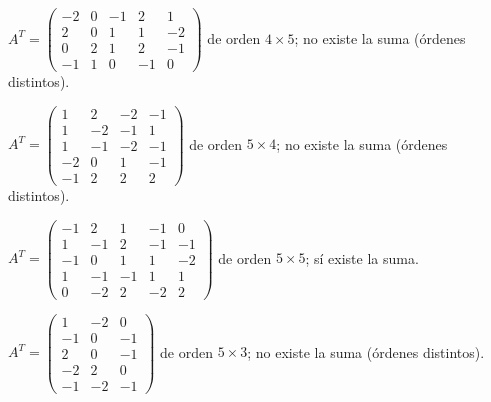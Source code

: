 \documentclass[12pt]{article}
\theoremstyle{remark}
\begin{document}
\begin{description}[style=nextline,leftmargin=3em,itemsep=0.45em]
\item[E93.] $A^T=\begin{pmatrix}-2&0&-1&2&1\\2&0&1&1&-2\\0&2&1&2&-1\\-1&1&0&-1&0\end{pmatrix}$ de orden $4\times 5$; no existe la suma (órdenes distintos).
\item[E94.] $A^T=\begin{pmatrix}1&2&-2&-1\\1&-2&-1&1\\1&-1&-2&-1\\-2&0&1&-1\\-1&2&2&2\end{pmatrix}$ de orden $5\times 4$; no existe la suma (órdenes distintos).
\item[E95.] $A^T=\begin{pmatrix}-1&2&1&-1&0\\1&-1&2&-1&-1\\-1&0&1&1&-2\\1&-1&-1&1&1\\0&-2&2&-2&2\end{pmatrix}$ de orden $5\times 5$; sí existe la suma.
\item[E96.] $A^T=\begin{pmatrix}1&-2&0\\-1&0&-1\\2&0&-1\\-2&2&0\\-1&-2&-1\end{pmatrix}$ de orden $5\times 3$; no existe la suma (órdenes distintos).
\end{description}
\end{document}
